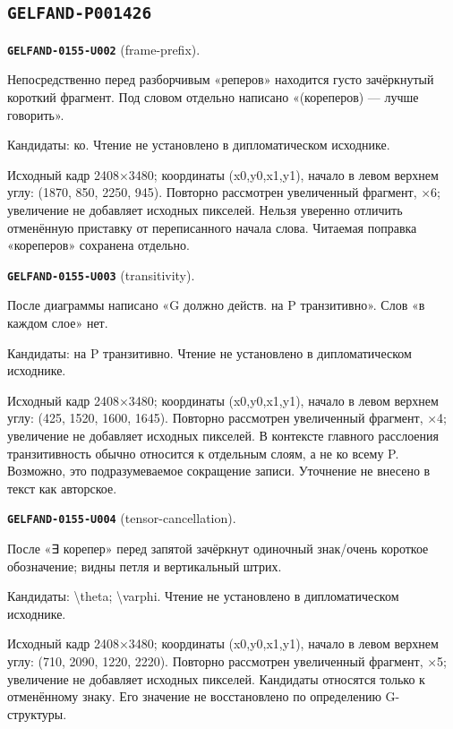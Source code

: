 \subsection*{\texttt{GELFAND-P001426}}
\par\noindent\leavevmode{}\label{GELFAND-0155-U002}\label{GELFAND-P001426:frame-prefix}\textbf{\texttt{GELFAND-0155-U002}} (frame-prefix).\nopagebreak[4]\par
Непосредственно перед разборчивым «реперов» находится густо зачёркнутый короткий фрагмент. Под словом отдельно написано «(кореперов) — лучше говорить».\par
Кандидаты: ко. Чтение не установлено в дипломатическом исходнике.\par
Исходный кадр 2408×3480; координаты (x0,y0,x1,y1), начало в левом верхнем углу: (1870, 850, 2250, 945). Повторно рассмотрен увеличенный фрагмент, ×6; увеличение не добавляет исходных пикселей. Нельзя уверенно отличить отменённую приставку от переписанного начала слова. Читаемая поправка «кореперов» сохранена отдельно.\par
\medskip
\par\noindent\leavevmode{}\label{GELFAND-0155-U003}\label{GELFAND-P001426:transitivity}\textbf{\texttt{GELFAND-0155-U003}} (transitivity).\nopagebreak[4]\par
После диаграммы написано «G должно действ. на P транзитивно». Слов «в каждом слое» нет.\par
Кандидаты: на P транзитивно. Чтение не установлено в дипломатическом исходнике.\par
Исходный кадр 2408×3480; координаты (x0,y0,x1,y1), начало в левом верхнем углу: (425, 1520, 1600, 1645). Повторно рассмотрен увеличенный фрагмент, ×4; увеличение не добавляет исходных пикселей. В контексте главного расслоения транзитивность обычно относится к отдельным слоям, а не ко всему P. Возможно, это подразумеваемое сокращение записи. Уточнение не внесено в текст как авторское.\par
\medskip
\par\noindent\leavevmode{}\label{GELFAND-0155-U004}\label{GELFAND-P001426:tensor-cancellation}\textbf{\texttt{GELFAND-0155-U004}} (tensor-cancellation).\nopagebreak[4]\par
После «∃ корепер» перед запятой зачёркнут одиночный знак/очень короткое обозначение; видны петля и вертикальный штрих.\par
Кандидаты: \textbackslash{}theta; \textbackslash{}varphi. Чтение не установлено в дипломатическом исходнике.\par
Исходный кадр 2408×3480; координаты (x0,y0,x1,y1), начало в левом верхнем углу: (710, 2090, 1220, 2220). Повторно рассмотрен увеличенный фрагмент, ×5; увеличение не добавляет исходных пикселей. Кандидаты относятся только к отменённому знаку. Его значение не восстановлено по определению G-структуры.\par
\medskip
